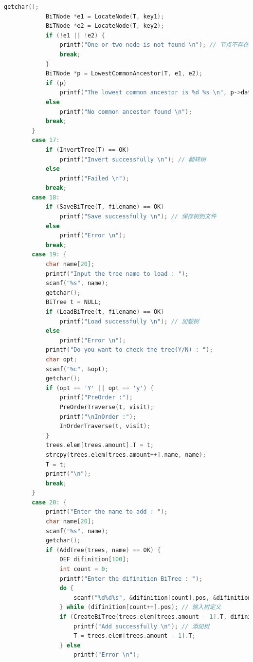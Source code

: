 \documentclass[supercite]{Experimental_Report}
\theoremstyle{definition}
\begin{document}
\begin{lstlisting}[language=c]
            getchar();
            BiTNode *e1 = LocateNode(T, key1);
            BiTNode *e2 = LocateNode(T, key2);
            if (!e1 || !e2) {
                printf("One or two node is not found \n"); // 节点不存在
                break;
            }
            BiTNode *p = LowestCommonAncestor(T, e1, e2);
            if (p)
                printf("The lowest common ancestor is %d %s \n", p->data.key, p->data.others); // 最近公共祖先
            else
                printf("No common ancestor found \n");
            break;
        }
        case 17:
            if (InvertTree(T) == OK)
                printf("Invert successfully \n"); // 翻转树
            else
                printf("Failed \n");
            break;
        case 18:
            if (SaveBiTree(T, filename) == OK)
                printf("Save successfully \n"); // 保存树到文件
            else
                printf("Error \n");
            break;
        case 19: {
            char name[20];
            printf("Input the tree name to load : ");
            scanf("%s", name);
            getchar();
            BiTree t = NULL;
            if (LoadBiTree(t, filename) == OK)
                printf("Load successfully \n"); // 加载树
            else
                printf("Error \n");
            printf("Do you want to check the tree(Y/N) : ");
            char opt;
            scanf("%c", &opt);
            getchar();
            if (opt == 'Y' || opt == 'y') {
                printf("PreOrder :");
                PreOrderTraverse(t, visit);
                printf("\nInOrder :");
                InOrderTraverse(t, visit);
            }
            trees.elem[trees.amount].T = t;
            strcpy(trees.elem[trees.amount++].name, name);
            T = t;
            printf("\n");
            break;
        }
        case 20: {
            printf("Enter the name to add : ");
            char name[20];
            scanf("%s", name);
            getchar();
            if (AddTree(trees, name) == OK) {
                DEF difinition[100];
                int count = 0;
                printf("Enter the difinition BiTree : ");
                do {
                    scanf("%d%d%s", &difinition[count].pos, &difinition[count].data.key, difinition[count].data.others);
                } while (difinition[count++].pos); // 输入树定义
                if (CreateBiTree(trees.elem[trees.amount - 1].T, difinition) == OK) {
                    printf("Add successfully \n"); // 添加树
                    T = trees.elem[trees.amount - 1].T;
                } else
                    printf("Error \n");

\end{lstlisting}
\end{document}
